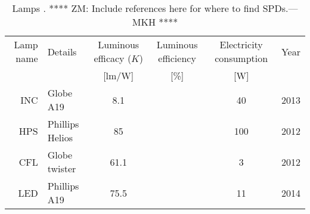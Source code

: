 

\begin{table}
\centering %
\caption{Lamps  \cite{aube2013}. **** ZM: Include references here for where to find SPDs.---MKH ****}
\begin{tabular}{r l c c c c}
  \toprule
  Lamp name 
      & Details 
      & Luminous efficacy ($K$) 
      & Luminous efficiency
      & Electricity consumption 
      & Year  \\
  
      &
      & [lm/W]
      & [\%]
      & [W] 
      & \\
  \midrule
  INC
      & Globe A19
      & 8.1
      &
      & 40
      & 2013\\
  HPS   
      & Phillips Helios
      & 85
      & 
      & 100
      & 2012 \\
  CFL
      & Globe twister
      & 61.1
      &  
      & 3
      & 2012 \\
  LED
      & Phillips A19
      & 75.5
      &  
      & 11
      & 2014 \\
  \bottomrule
\end{tabular}
\label{tab:lamps}
\end{table}


